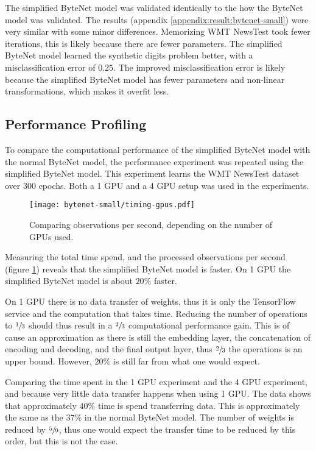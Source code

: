 The simplified ByteNet model was validated identically to the how the ByteNet model was validated. The results (appendix \ref{appendix:result:bytenet-small}) were very similar with some minor differences. Memorizing WMT NewsTest took fewer iterations, this is likely because there are fewer parameters. The simplified ByteNet model learned the synthetic digits problem better, with a misclassification error of $0.25$. The improved misclassification error is likely because the simplified ByteNet model has fewer parameters and non-linear transformations, which makes it overfit less.

\subsection{Performance Profiling}

To compare the computational performance of the simplified ByteNet model with the normal ByteNet model, the performance experiment was repeated using the simplified ByteNet model. This experiment learns the WMT NewsTest dataset over 300 epochs. Both a 1 GPU and a 4 GPU setup was used in the experiments.

\begin{figure}[h]
    \centering
    \texttt{[image: bytenet-small/timing-gpus.pdf]}
    \caption{Comparing observations per second, depending on the number of GPUs used.}
    \label{fig:result:simple-bytenet:timing-gpus}
\end{figure}

Measuring the total time spend, and the processed observations per second (figure \ref{fig:result:simple-bytenet:timing-gpus}) reveals that the simplified ByteNet model is faster. On 1 GPU the simplified ByteNet model is about $20\%$ faster.

On 1 GPU there is no data transfer of weights, thus it is only the TensorFlow service and the computation that takes time. Reducing the number of operations to $\sfrac{1}{3}$ should thus result in a $\sfrac{2}{3}$ computational performance gain. This is of cause an approximation as there is still the embedding layer, the concatenation of encoding and decoding, and the final output layer, thus $\sfrac{2}{3}$ the operations is an upper bound. However, $20\%$ is still far from what one would expect.

Comparing the time spent in the 1 GPU experiment and the 4 GPU experiment, and because very little data transfer happens when using 1 GPU. The data shows that approximately $40\%$ time is spend transferring data. This is approximately the same as the $37\%$ in the normal ByteNet model. The number of weights is reduced by $\sfrac{5}{9}$, thus one would expect the transfer time to be reduced by this order, but this is not the case.


